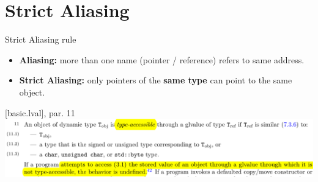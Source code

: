 \section{Strict Aliasing}

\begin{frame}{Strict Aliasing rule}
  \begin{itemize}
  \item \textbf{Aliasing:} more than one name (pointer / reference) refers to same address.\\[1ex]
  \item \textbf{Strict Aliasing:} only pointers of the \textbf{same type} can point to the same object.
  \end{itemize}

  \vfill
  \begin{block}{[basic.lval], par. 11}
    \includegraphics[width=\textwidth]{img/cplusplus_draft/basic.lval.11.png}
  \end{block}
\end{frame}

